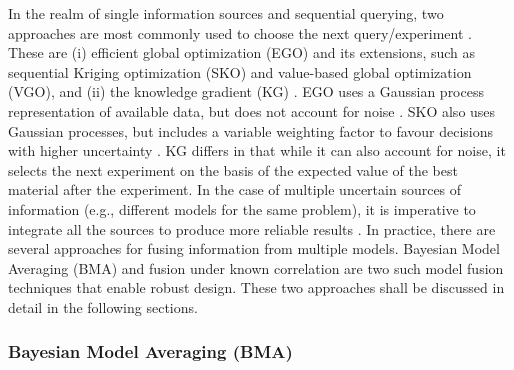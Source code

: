 \documentclass[utf8]{frontiersSCNS} %
\begin{document}
In the realm of  single information sources and sequential querying, two approaches are most commonly used to choose the next query/experiment \cite{scott2011correlated}. These are  (i) efficient global optimization (EGO) \cite{jones1998efficient} and its extensions, such as sequential Kriging optimization (SKO) \cite{huang2006sequential} and value-based global optimization (VGO)\cite{moore2014value}, and (ii) the knowledge gradient (KG) \cite{frazier2008knowledge,gupta1994bayesian,gupta1996bayesian}. EGO uses a Gaussian process \cite{rasmussen2004gaussian} representation of available data, but does not account for noise \cite{schonlau1996global,schonlau1998global}. SKO also uses Gaussian processes, but includes a variable weighting factor to favour decisions with higher uncertainty \cite{scott2011correlated}. KG differs in that while it can also account for noise, it selects the next experiment on the basis of the expected value of the best material after the experiment. In the case of multiple uncertain sources of information (e.g., different models for the same problem), it is imperative to integrate all the sources to produce more reliable results \cite{dasey2007information}. In practice, there are several approaches for fusing information from multiple models. Bayesian Model Averaging (BMA) and fusion under known correlation \cite{Correlation1,Correlation2,Correlation3,Correlation4} are two such  model fusion techniques that enable robust design. These two approaches shall be discussed in detail in the following sections. 


\subsubsection{Bayesian Model Averaging (BMA)}
\end{document}
